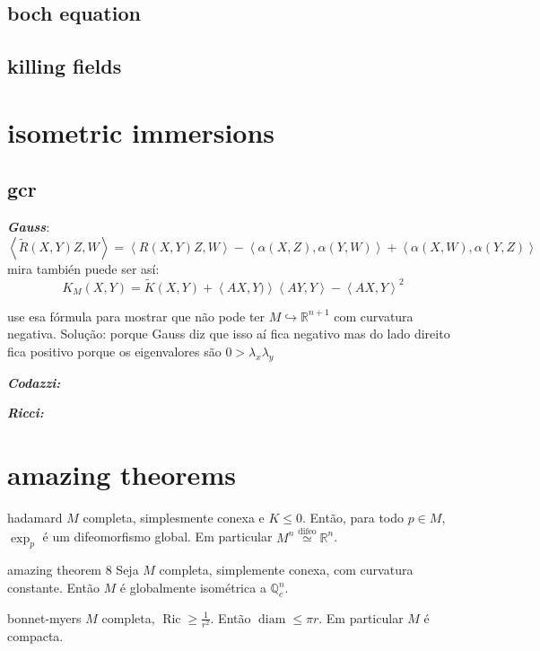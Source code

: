 \subsection{boch equation}

\subsection{killing fields}

\section{isometric immersions}

\subsection{gcr}
\textit{\textbf{Gauss}}:
\[\left<\tilde{R}(X,Y)Z,W\right>=\left<R(X,Y)Z,W\right>-\left<\alpha(X,Z),\alpha(Y,W)\right>+\left<\alpha(X,W),\alpha(Y,Z)\right>\]
mira también puede ser así:
\[K_M(X,Y)=\tilde{K}(X,Y)+\left<AX,Y)\right>\left<AY,Y\right>-\left<AX,Y\right>^2\]
\begin{exercise}\leavevmode
use esa fórmula para mostrar que não pode ter \(M \hookrightarrow \mathbb{R}^{n+1}\) com curvatura negativa. Solução: porque Gauss diz que isso aí fica negativo mas do lado direito fica positivo porque os eigenvalores são \(0>\lambda_x\lambda_y\)
\end{exercise}

\textit{\textbf{Codazzi:}}

 \textit{\textbf{Ricci:}}

\section{amazing theorems}

\begin{thing6}{hadamard}\leavevmode
\(M\) completa, simplesmente conexa e \(K \leq  0\). Então, para todo \(p \in M\), \(\operatorname{exp}_p\) é um difeomorfismo global. Em particular \(M^n \overset{\operatorname{difeo}}{\simeq} \mathbb{R}^n\).
\end{thing6}

\begin{thing6}{amazing theorem 8}\leavevmode
Seja \(M\) completa, simplemente conexa, com curvatura constante. Então \(M\) é globalmente isométrica a \(\mathbb{Q}^n_c\).
\end{thing6}

\begin{thing6}{bonnet-myers}\leavevmode
	\(M\) completa, \(\operatorname{Ric} \geq \frac{1}{r^2}\). Então \(\operatorname{diam}\leq \pi r\). Em particular \(M\) é compacta.
\end{thing6}

